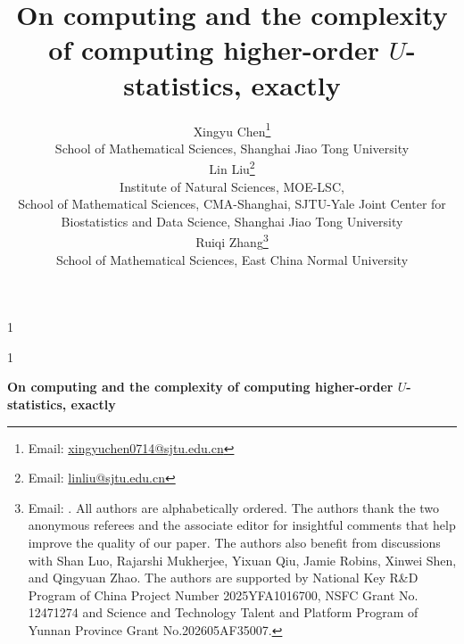 \documentclass[sn-mathphys, natbib=false]{sn-jnl}
\newcommand{\anon}{1}
\theoremstyle{plain}
\theoremstyle{definition}
\begin{document}
\def\spacingset#1{\renewcommand{\baselinestretch}%
{#1}\small\normalsize} \spacingset{1}



\anon
{
  \title{\bf On computing and the complexity of computing higher-order $U$-statistics, exactly}
 \author{
    \centering
    Xingyu Chen\footnote{Email: \href{xingyuchen0714@sjtu.edu.cn}{xingyuchen0714@sjtu.edu.cn}} \\
    School of Mathematical Sciences, Shanghai Jiao Tong University \\
    Lin Liu\footnote{Email: \href{linliu@sjtu.edu.cn}{linliu@sjtu.edu.cn}} \\
    Institute of Natural Sciences, MOE-LSC, \\ 
    School of Mathematical Sciences, CMA-Shanghai, SJTU-Yale Joint Center for Biostatistics and Data Science, Shanghai Jiao Tong University \\
    Ruiqi Zhang\footnote{Email: \href{}{}. All authors are alphabetically ordered. The authors thank the two anonymous referees and the associate editor for insightful comments that help improve the quality of our paper. The authors also benefit from discussions with Shan Luo, Rajarshi Mukherjee, Yixuan Qiu, Jamie Robins, Xinwei Shen, and Qingyuan Zhao. The authors are supported by National Key R\&D Program of China Project Number 2025YFA1016700, NSFC Grant No. 12471274 and Science and Technology Talent and Platform Program of Yunnan Province Grant No.202605AF35007.} \\
    School of Mathematical Sciences, East China Normal University \\
    }
  \maketitle
  \thispagestyle{empty}
} \fi

\anon
{
  \bigskip
  \bigskip
  \bigskip
  \begin{center}
    {\LARGE\bf On computing and the complexity of computing higher-order $U$-statistics, exactly}
\end{center}
  \medskip
} \fi
\end{document}
